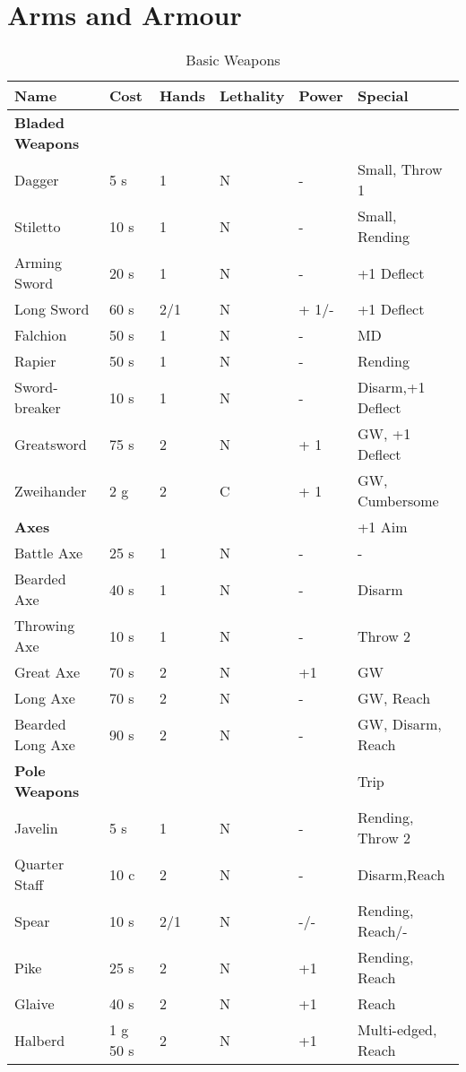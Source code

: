 \chapter{Arms and Armour}
\label{chap:arms}

\begin{table}[!ht]
	\flushleft
	\caption{Basic Weapons}
		\label{tab:weps}
	\begin{tabular}{|l|l|l|l|l|l|}
		\hline
		Name & Cost & Hands & Lethality  & Power & Special\\ [0.5ex]
		\hline 
		\textbf{Bladed Weapons} & & & & & \\
		\hline
		Dagger & 5 s & 1 & N & - & Small, Throw 1\\
		Stiletto & 10 s & 1 & N & - & Small, Rending \\
		Arming Sword & 20 s & 1 & N & - & +1 Deflect\\
		Long Sword & 60 s & 2/1 & N & + 1/- & +1 Deflect\\
		Falchion & 50 s & 1 & N & - & MD \\ 
		Rapier & 50 s & 1 & N & - & Rending \\ 
		Sword-breaker & 10 s & 1 & N & - & Disarm,+1 Deflect \\
		Greatsword & 75 s & 2 & N & + 1 & GW, +1 Deflect\\
		Zweihander & 2 g & 2 & C & + 1 & GW, Cumbersome\\ 
		\hline 
		\textbf{Axes} & & & & & +1 Aim\\
		\hline
		Battle Axe & 25 s & 1 & N & - & - \\
		Bearded Axe & 40 s & 1 & N & - & Disarm \\
		Throwing Axe & 10 s & 1 & N & - & Throw 2 \\
		Great Axe & 70 s & 2 & N & +1 & GW \\
		Long Axe & 70 s & 2 & N & - & GW, Reach \\
		Bearded Long Axe & 90 s & 2 & N & - & GW, Disarm, Reach \\
		\hline
		\textbf{Pole Weapons} & & & & & Trip \\
		\hline
		Javelin & 5 s & 1 & N & - & Rending, Throw 2\\
		Quarter Staff & 10 c & 2 &  N & - & Disarm,Reach\\
		Spear & 10 s & 2/1 & N & -/- & Rending, Reach/- \\
		Pike & 25 s & 2 & N & +1 & Rending, Reach\\
		Glaive & 40 s & 2 & N & +1 & Reach \\
		Halberd & 1 g 50 s & 2 & N & +1 & Multi-edged, Reach\\

\end{tabular}
\end{table}
